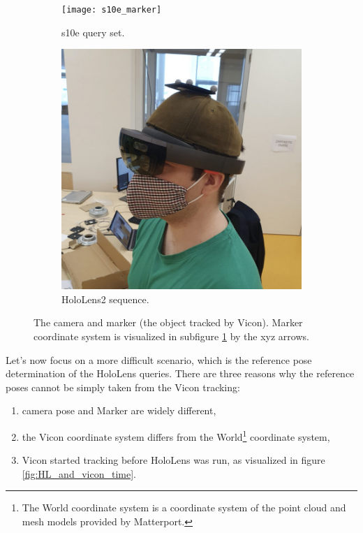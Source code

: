 \documentclass[twoside]{ctuthesis}
\theoremstyle{plain}
\theoremstyle{definition}
\theoremstyle{note}
\begin{document}
\begin{figure}
	\begin{subfigure}{0.45\textwidth}
		\texttt{[image: s10e\_marker]}
		\caption{s10e query set.}
		\label{fig:s10e-marker}
	\end{subfigure}
	\hspace*{\fill}	%
	\begin{subfigure}{0.45\textwidth}
		\includegraphics[width=\textwidth]{HL1_marker}
		\caption{HoloLens2 sequence.}
		\label{fig:holoLens-marker}
	\end{subfigure}
	\caption[Camera and Marker]{The camera and marker (the object tracked by Vicon). Marker coordinate system is visualized in subfigure \ref{fig:s10e-marker} by the xyz arrows.}
	\label{fig:camera-markers}
\end{figure}

Let's now focus on a more difficult scenario, which is the reference pose determination of the HoloLens queries. There are three reasons why the reference poses cannot be simply taken from the Vicon tracking:

\begin{enumerate}
	\item camera pose and Marker are widely different,
	\item the Vicon coordinate system differs from the World\footnote{The World coordinate system is a coordinate system of the point cloud and mesh models provided by Matterport.} coordinate system,
	\item Vicon started tracking before HoloLens was run, as visualized in figure \ref{fig:HL_and_vicon_time}.
\end{enumerate}
\end{document}
